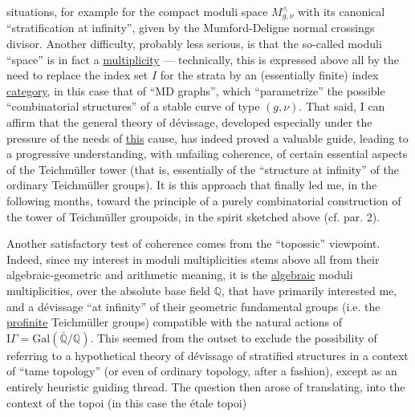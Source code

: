 
situations, for example for the compact moduli space
$M^{\wedge}_{g,\nu}$ with its canonical ``stratification at infinity'', given
by the Mumford-Deligne normal crossings divisor. Another
difficulty, probably less serious, is that the so-called
moduli ``space'' is in fact a \uline{multiplicity} --- technically,
this is expressed above all by the need to replace
the index set $I$ for the strata by an (essentially finite)
index \uline{category}, in this case that of
``MD graphs'', which ``parametrize'' the possible ``combinatorial structures''
of a stable curve of type $(g,\nu)$. That said, I can
affirm that the general theory of dévissage, developed especially
under the pressure of the needs of \uline{this} cause, has indeed proved
a valuable guide, leading to a progressive understanding,
with unfailing coherence, of certain essential aspects
of the Teichmüller tower (that is, essentially
of the ``structure at infinity'' of the ordinary Teichmüller groups).
It is this approach that finally led me, in the following
months, toward the principle of a purely combinatorial
construction of the tower of Teichmüller groupoids, in the spirit
sketched above (cf. par. 2).

Another satisfactory test of coherence comes from the
``topossic'' viewpoint. Indeed, since my interest in moduli
multiplicities stems above all from their algebraic-geometric
and arithmetic meaning, it is the \uline{algebraic} moduli
multiplicities, over the absolute base field $\mathbb{Q}$, that have
primarily interested me, and a dévissage ``at infinity'' of their
geometric fundamental groups (i.e. the \uline{profinite} Teichmüller
groups) compatible with the natural actions of
$\mathrm{I}\!\Gamma = \mathrm{Gal}(\bar{\mathbb{Q}}/\mathbb{Q})$. This seemed from the outset to exclude the possibility of
referring to a hypothetical theory of dévissage of stratified
structures in a context of ``tame topology'' (or even of
ordinary topology, after a fashion), except as an
entirely heuristic guiding thread. The question then arose of translating,
into the context of the topoi (in this case the étale topoi)

